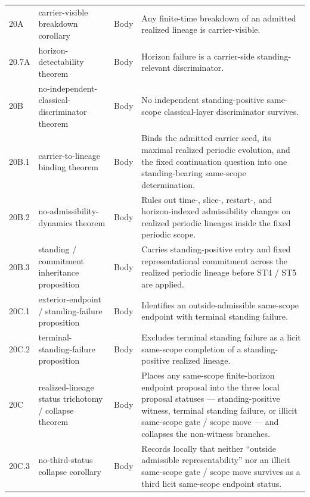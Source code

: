 \begin{center}
\begin{tabularx}{0.98\textwidth}{@{}L{0.12\textwidth}L{0.20\textwidth}L{0.16\textwidth}Y@{}}
20A & carrier-visible breakdown corollary & Body & Any finite-time breakdown of an admitted realized lineage is carrier-visible.\\
20.7A & horizon-detectability theorem & Body & Horizon failure is a carrier-side standing-relevant discriminator.\\
20B & no-independent-classical-discriminator theorem & Body & No independent standing-positive same-scope classical-layer discriminator survives.\\
20B.1 & carrier-to-lineage binding theorem & Body & Binds the admitted carrier seed, its maximal realized periodic evolution, and the fixed continuation question into one standing-bearing same-scope determination.\\
20B.2 & no-admissibility-dynamics theorem & Body & Rules out time-, slice-, restart-, and horizon-indexed admissibility changes on realized periodic lineages inside the fixed periodic scope.\\
20B.3 & standing / commitment inheritance proposition & Body & Carries standing-positive entry and fixed representational commitment across the realized periodic lineage before ST4 / ST5 are applied.\\
20C.1 & exterior-endpoint / standing-failure proposition & Body & Identifies an outside-admissible same-scope endpoint with terminal standing failure.\\
20C.2 & terminal-standing-failure proposition & Body & Excludes terminal standing failure as a licit same-scope completion of a standing-positive realized lineage.\\
20C & realized-lineage status trichotomy / collapse theorem & Body & Places any same-scope finite-horizon endpoint proposal into the three local proposal statuses --- standing-positive witness, terminal standing failure, or illicit same-scope gate / scope move --- and collapses the non-witness branches.\\
20C.3 & no-third-status collapse corollary & Body & Records locally that neither ``outside admissible representability'' nor an illicit same-scope gate / scope move survives as a third licit same-scope endpoint status.\\
\bottomrule
\end{tabularx}
\end{center}

